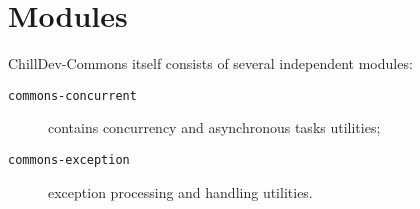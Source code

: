 %

\section{Modules}

ChillDev-Commons itself consists of several independent modules:

\begin{description}
    \item[\texttt{commons-concurrent}]
    contains concurrency and asynchronous tasks utilities;

    \item[\texttt{commons-exception}]
    exception processing and handling utilities.
\end{description}
